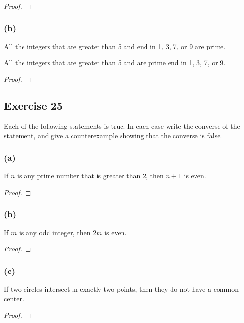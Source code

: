 \documentclass[14pt]{extarticle}
\begin{document}
\begin{proof}

\end{proof}

\subsubsection{(b)}
All the integers that are greater than 5 and end in 1, 3, 7, or 9 are prime. 

All the integers that are greater than 5 and are prime end in 1, 3, 7, or 9.

\begin{proof}

\end{proof}

\subsection{Exercise 25}
Each of the following statements is true. In each case write the converse of the statement, and give a counterexample showing that the converse is false.

\subsubsection{(a)}
If $n$ is any prime number that is greater than 2, then $n + 1$ is even.

\begin{proof}

\end{proof}

\subsubsection{(b)}
If $m$ is any odd integer, then $2m$ is even.

\begin{proof}

\end{proof}

\subsubsection{(c)}
If two circles intersect in exactly two points, then they do not have a common center.

\begin{proof}

\end{proof}
\end{document}

